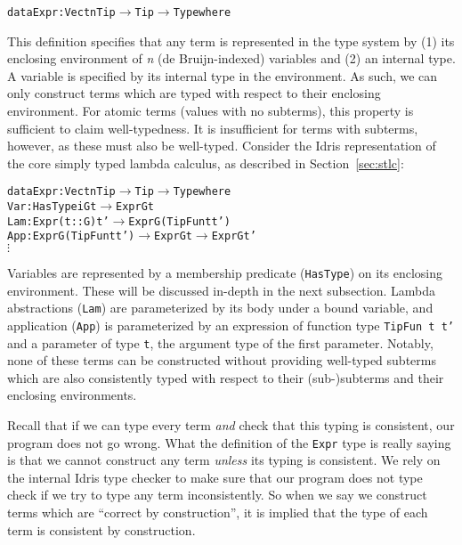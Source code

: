 \begin{alltt}
  data Expr : Vect n Tip \(\rightarrow\) Tip \(\rightarrow\) Type where
\end{alltt}

This definition specifies that any term is represented in the type system by (1) its enclosing environment of \textit{n} (de Bruijn-indexed) variables and (2) an internal type. A variable is specified by its internal type in the environment. As such, we can only construct terms which are typed with respect to their enclosing environment. For atomic terms (values with no subterms), this property is sufficient to claim well-typedness. It is insufficient for terms with subterms, however, as these must also be well-typed. Consider the Idris representation of the core simply typed lambda calculus, as described in Section~\ref{sec:stlc}:

\begin{alltt}
  data Expr : Vect n Tip \(\rightarrow\) Tip \(\rightarrow\) Type where
    Var : HasType i G t \(\rightarrow\) Expr G t
    Lam : Expr (t :: G) t' \(\rightarrow\) Expr G (TipFun t t')
    App : Expr G (TipFun t t') \(\rightarrow\) Expr G t \(\rightarrow\) Expr G t'
    \(\vdots\)  
\end{alltt}

Variables are represented by a membership predicate (\texttt{HasType}) on its enclosing environment. These will be discussed in-depth in the next subsection. Lambda abstractions (\texttt{Lam}) are parameterized by its body under a bound variable, and application (\texttt{App}) is parameterized by an expression of function type \texttt{TipFun t t'} and a parameter of type \texttt{t}, the argument type of the first parameter. Notably, none of these terms can be constructed without providing well-typed subterms which are also consistently typed with respect to their (sub-)subterms and their enclosing environments.

Recall that if we can type every term \emph{and} check that this typing is consistent, our program does not go wrong. What the definition of the \texttt{Expr} type is really saying is that we cannot construct any term \emph{unless} its typing is consistent. We rely on the internal Idris type checker to make sure that our program does not type check if we try to type any term inconsistently. So when we say we construct terms which are ``correct by construction'', it is implied that the type of each term is consistent by construction.
 


